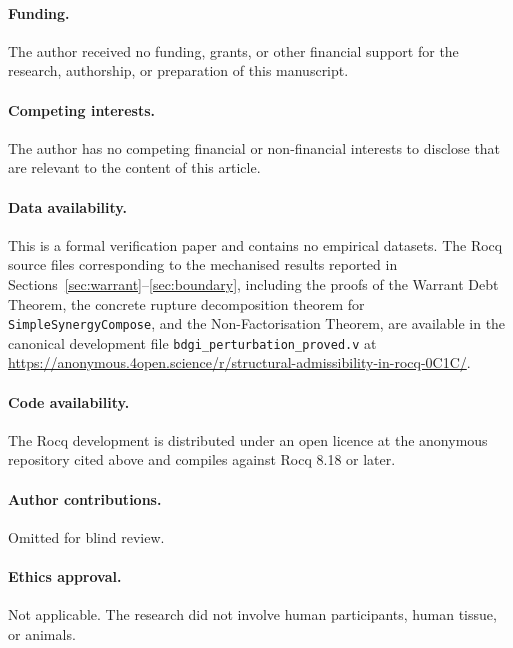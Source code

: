 \documentclass[12pt]{article}
\theoremstyle{plain}
\theoremstyle{definition}
\theoremstyle{remark}
\begin{document}
\paragraph{Funding.}
The author received no funding, grants, or other financial support
for the research, authorship, or preparation of this manuscript.

\paragraph{Competing interests.}
The author has no competing financial or non-financial interests to
disclose that are relevant to the content of this article.

\paragraph{Data availability.}
This is a formal verification paper and contains no empirical
datasets. The Rocq source files corresponding to the mechanised
results reported in Sections~\ref{sec:warrant}--\ref{sec:boundary},
including the proofs of the Warrant Debt Theorem, the concrete
rupture decomposition theorem for \texttt{SimpleSynergyCompose}, and
the Non-Factorisation Theorem, are available in the canonical
development file \texttt{bdgi\_perturbation\_proved.v} at
\url{https://anonymous.4open.science/r/structural-admissibility-in-rocq-0C1C/}.

\paragraph{Code availability.}
The Rocq development is distributed under an open licence at the
anonymous repository cited above and compiles against Rocq 8.18 or later.

\paragraph{Author contributions.}
Omitted for blind review.

\paragraph{Ethics approval.}
Not applicable. The research did not involve human participants,
human tissue, or animals.
\end{document}
